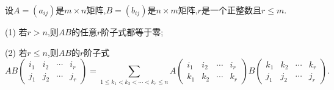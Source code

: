 \documentclass[lang=cn,newtx,10pt,scheme=chinese]{elegantbook}
\begin{document}
\begin{corollary}\label{corollary:Cauchy-Binet公式推论}
设\(A=(a_{ij})\)是\(m\times n\)矩阵,\(B=(b_{ij})\)是\(n\times m\)矩阵,\(r\)是一个正整数且\(r\leq m\).

(1) 若\(r > n\),则\(AB\)的任意\(r\)阶子式都等于零;

(2) 若\(r\leq n\),则\(AB\)的\(r\)阶子式
\[AB\left(\begin{matrix}
i_1 & i_2 & \cdots & i_r\\
j_1 & j_2 & \cdots & j_r
\end{matrix}\right)=\sum_{1\leq k_1<k_2<\cdots<k_r\leq n}A\left(\begin{matrix}
i_1 & i_2 & \cdots & i_r\\
k_1 & k_2 & \cdots & k_r
\end{matrix}\right)B\left(\begin{matrix}
k_1 & k_2 & \cdots & k_r\\
j_1 & j_2 & \cdots & j_r
\end{matrix}\right).\]
\end{corollary}
\end{document}
